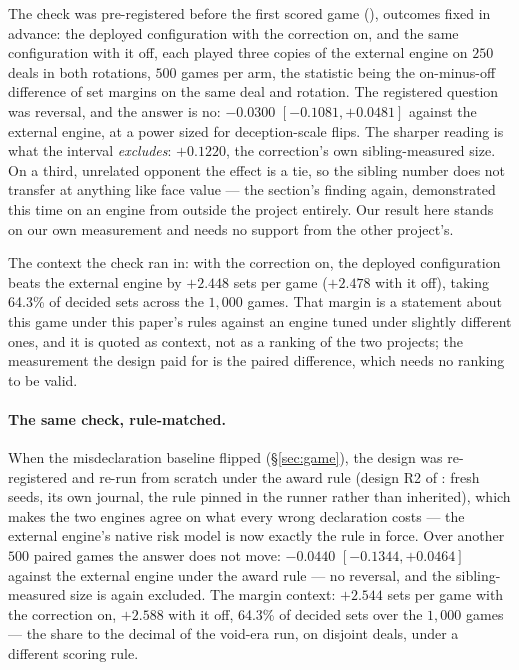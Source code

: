 \documentclass[11pt,letterpaper]{article}
\begin{document}
The check was pre-registered before the first scored game
(), outcomes fixed in advance: the
deployed configuration with the correction on, and the same configuration
with it off, each played three copies of the external engine on $250$ deals in both
rotations, $500$ games per arm, the statistic being the on-minus-off
difference of set margins on the same deal and rotation. The registered
question was reversal, and the answer is no: $-0.0300$
$[-0.1081, +0.0481]$ against the external engine, at a power sized for
deception-scale flips. The sharper reading is what the interval
\emph{excludes}: $+0.1220$, the correction's own sibling-measured size. On a
third, unrelated opponent the effect is a tie, so the sibling number does not
transfer at anything like face value --- the section's finding again,
demonstrated this time on an engine from outside the project entirely. Our
result here stands on our own measurement and needs no support from the other
project's.

The context the check ran in: with the correction on, the deployed
configuration beats the external engine by $+2.448$ sets per game ($+2.478$ with it off),
taking 64.3\% of decided sets across the $1{,}000$ games. That margin is a
statement about this game under this paper's rules against an engine tuned
under slightly different ones, and it is quoted as context, not as a ranking
of the two projects; the measurement the design paid for is the paired
difference, which needs no ranking to be valid.

\paragraph{The same check, rule-matched.} When the misdeclaration baseline
flipped (\S\ref{sec:game}), the design was re-registered and re-run from
scratch under the award rule (design R2 of
: fresh seeds, its own journal, the
rule pinned in the runner rather than inherited), which makes the two
engines agree on what every wrong declaration costs --- the external engine's native risk
model is now exactly the rule in force. Over another $500$ paired games the
answer does not move: $-0.0440$ $[-0.1344, +0.0464]$ against the external engine
under the award rule --- no reversal, and the sibling-measured size is again
excluded. The margin context: $+2.544$ sets per game with the correction on,
$+2.588$ with it off, 64.3\% of decided sets over the $1{,}000$ games ---
the share to the decimal of the void-era run, on disjoint deals, under a
different scoring rule.
\end{document}
